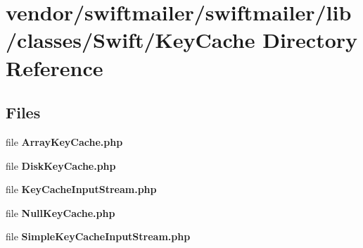 \section{vendor/swiftmailer/swiftmailer/lib/classes/\+Swift/\+Key\+Cache Directory Reference}
\label{dir_8cdbb20237e8f177182feabd1f7658f2}
\subsection*{Files}
\begin{DoxyCompactItemize}
\item 
file {\bf Array\+Key\+Cache.\+php}
\item 
file {\bf Disk\+Key\+Cache.\+php}
\item 
file {\bf Key\+Cache\+Input\+Stream.\+php}
\item 
file {\bf Null\+Key\+Cache.\+php}
\item 
file {\bf Simple\+Key\+Cache\+Input\+Stream.\+php}
\end{DoxyCompactItemize}
